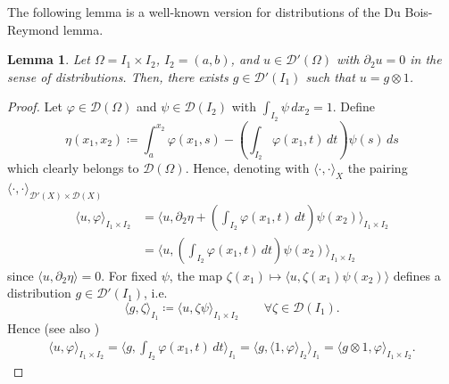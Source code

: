 \documentclass[a4, 11pt, reqno, final]{amsart}
\newcommand{\calD}{\mathcal{D}}
\theoremstyle{plain}%
\newtheorem{lemma}[theorem]{Lemma}
\newcommand{\QED}{\hspace{1ex}\hfill$\blacksquare$\vspace{2ex}}
\begin{document}
	The following lemma is a well-known version for distributions of the Du Bois-Reymond lemma.
	\begin{lemma}\label{lemmadistr}
		Let $\Omega = I_1 \times I_2$, $I_2 = (a,b)$, and $u \in \calD'(\Omega)$ with $\partial_2 u = 0$ in the sense of distributions. Then, there exists $g \in \calD'(I_1)$ such that $u=g\otimes 1$.
	\end{lemma}
	\begin{proof}
		Let $\varphi \in \calD(\Omega)$ and $\psi \in \calD(I_2)$ with $\int_{I_2} \psi \, dx_2 = 1$.
		Define
		$$ \eta(x_1,x_2) \coloneqq   \int_a^{x_2} \varphi(x_1,s) - (\int_{I_2}\varphi(x_1,t)\, dt) \psi(s) \, ds$$
		which clearly belongs to $\calD(\Omega)$.
		Hence, denoting with $\langle \cdot, \cdot\rangle_X$ the pairing $\langle \cdot , \cdot\rangle_{\calD'(X)\times \calD(X)}$
		$$ \begin{aligned}
			\langle u, \varphi \rangle_{I_1\times I_2}
			&=\langle u, \partial_2 \eta + (\int_{I_2}\varphi(x_1,t)\, dt) \psi(x_2)\rangle_{I_1\times I_2}\\
			&= \langle u, (\int_{I_2}\varphi(x_1,t)\, dt) \psi(x_2)\rangle_{I_1\times I_2}
		\end{aligned}$$
		since $\langle u, \partial_2 \eta \rangle = 0$.
		For fixed $\psi$, the map $\zeta(x_1) \mapsto \langle u, \zeta(x_1)\psi(x_2)\rangle $ defines a distribution $g\in\calD'(I_1)$, i.e.
		$$ \langle g, \zeta\rangle_{I_1} \coloneqq   \langle u, \zeta \psi \rangle_{I_1\times I_2} \qquad \forall \zeta \in \calD(I_1).$$
		Hence (see also \cite[Ch. 2.7]{Mitrea2013})
		$$ \begin{aligned}
			\langle u , \varphi \rangle_{I_1\times I_2} = \langle g, \int_{I_2}\varphi(x_1,t)\, dt \rangle_{I_1}=
			\langle g, \langle 1, \varphi\rangle_{I_2} \rangle_{I_1}=
			\langle g\otimes 1, \varphi\rangle_{I_1\times I_2}.
		\end{aligned} $$
	\end{proof}
\end{document}
